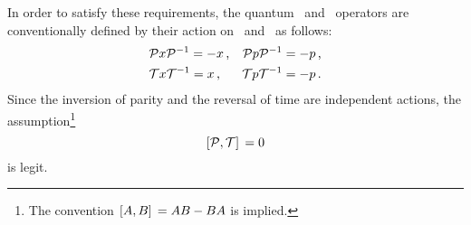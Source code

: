         In order to satisfy these requirements, the quantum \hP\ and \hT\ operators are conventionally defined by their action on \hx\ and \hp\ as follows:
        \begin{align}
            \label{eq:quantum-P}
            &\mathcal{{P}}{x}\mathcal{{P}}^{-1} = -{x}
            \,\text{,}
            &\mathcal{{P}}{p}\mathcal{{P}}^{-1} = -{p}
            \,\text{,}
            \\
            \label{eq:quantum-T}
            &\mathcal{{T}}{x}\mathcal{{T}}^{-1} = {x}
            \,\text{,}
            &\mathcal{{T}}{p}\mathcal{{T}}^{-1} = -{p}
            \,\text{.}
        \end{align}
        Since the inversion of parity and the reversal of time are independent actions, the assumption\footnote{The convention $\comm*{\togglehat{A}}{\togglehat{B}} = \togglehat{A}\togglehat{B} - \togglehat{B}\togglehat{A}$ is implied.}
        \begin{equation}
            \label{eq:PT-commutator}
            \comm*{\hP}{\hT} = 0 
        \end{equation}
        is legit.

